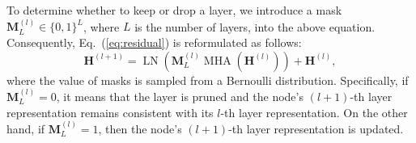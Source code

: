 \documentclass[letterpaper]{article} %
\begin{document}
To determine whether to keep or drop a layer, we introduce a mask $\mathbf{M}^{(l)}_{L} \in \{0,1\}^{L}$, where $L$ is the number of layers, into the above equation. Consequently, Eq.~(\ref{eq:residual}) is reformulated as follows:
\begin{equation}
\mathbf{H}^{(l+1)}=\operatorname{LN}\left( \mathbf{M}^{(l)}_{L} \operatorname{MHA}\left(\mathbf{H}^{(l)}\right)\right)+\mathbf{H}^{(l)},
\label{eq:residual-mask}
\end{equation}
where the value of masks is sampled from a Bernoulli distribution. Specifically, if $\mathbf{M}^{(l)}_{L}=0$, it means that the layer is pruned and the node's $(l+1)$-th layer representation remains consistent with its $l$-th layer representation. On the other hand, if $\mathbf{M}^{(l)}_{L}=1$, then the node's $(l+1)$-th layer representation is updated.
\end{document}
